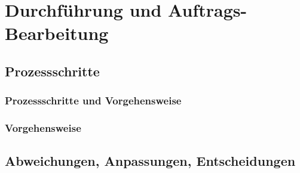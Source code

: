 \chapter{Durchführung und Auftrags-Bearbeitung}
	
\section{Prozessschritte}
\subsection{Prozessschritte und Vorgehensweise}

\subsection{Vorgehensweise}


\section{Abweichungen, Anpassungen, Entscheidungen}